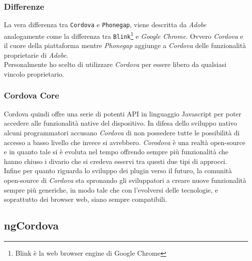 \subsubsection{Differenze}
La vera differenza tra \texttt{Cordova} e \texttt{Phonegap}, viene descritta da \emph{Adobe} analogamente come la differenza tra \texttt{Blink}\footnote{Blink è la web browser engine di Google Chrome\cite{wiki:blink}} e \emph{Google Chrome}. Ovvero \emph{Cordova} e il cuore della piattaforma mentre \emph{Phonegap} aggiunge a \emph{Cordova} delle funzionalità proprietarie di \emph{Adobe}.\\
Personalmente ho scelto di utilizzare \emph{Cordova} per essere libero da qualsiasi vincolo proprietario.

\subsubsection{Cordova Core}
Cordova quindi offre una serie di potenti API in linguaggio Javascript per poter accedere alle funzionalità native del dispositivo. In difesa dello sviluppo nativo alcuni programmatori accusano \emph{Cordova} di non possedere tutte le possibilità di accesso a basso livello che invece si avrebbero. \emph{Corodova} è una realtà open-source e in quanto tale si è evoluta nel tempo offrendo sempre più funzionalità che hanno chiuso i divario che si credeva esservi tra questi due tipi di approcci.\\
Infine per quanto riguarda lo sviluppo dei plugin verso il futuro, la comunità open-source di \emph{Cordova} sta spronando gli sviluppatori a creare nuove funzionalità sempre più generiche, in modo tale che con l'evolversi delle tecnologie, e soprattutto dei browser web, siano sempre compatibili.

\subsection{ngCordova}

